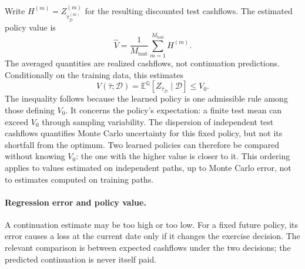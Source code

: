 \documentclass[11pt,a4paper]{article}
\newcommand{\E}{\mathbb E^{\mathbb Q}}
\begin{document}
Write $H^{(m)}=Z_{\widehat\tau_{\mathcal D}^{(m)}}^{(m)}$ for the resulting
discounted test cashflows. The estimated policy value is
\begin{equation}\label{eq:eval}
 \widehat V=\frac1{M_{\mathrm{test}}}\sum_{m=1}^{M_{\mathrm{test}}}H^{(m)}.
\end{equation}
The averaged quantities are realized cashflows, not continuation predictions.
Conditionally on the training data, this estimates
\begin{equation}\label{eq:bound}
 V(\widehat\tau;\mathcal D)
 =\E[Z_{\widehat\tau_{\mathcal D}}\mid\mathcal D]\leq V_0.
\end{equation}
The inequality follows because the learned policy is one admissible rule among
those defining $V_0$. It concerns the policy's expectation: a finite test mean
can exceed $V_0$ through sampling variability.
The dispersion of independent test cashflows quantifies Monte Carlo uncertainty
for this fixed policy, but not its shortfall from the optimum.
Two learned policies can therefore be compared without knowing $V_0$: the one with
the higher value is closer to it. This ordering applies to values estimated on
independent paths, up to Monte Carlo error, not to estimates computed on training paths.

\paragraph{Regression error and policy value.}
A continuation estimate may be too high or too low. For a fixed future policy,
its error causes a loss at the current date only if it changes the exercise decision.
The relevant comparison is between expected cashflows under the two decisions;
the predicted continuation is never itself paid.
\end{document}
